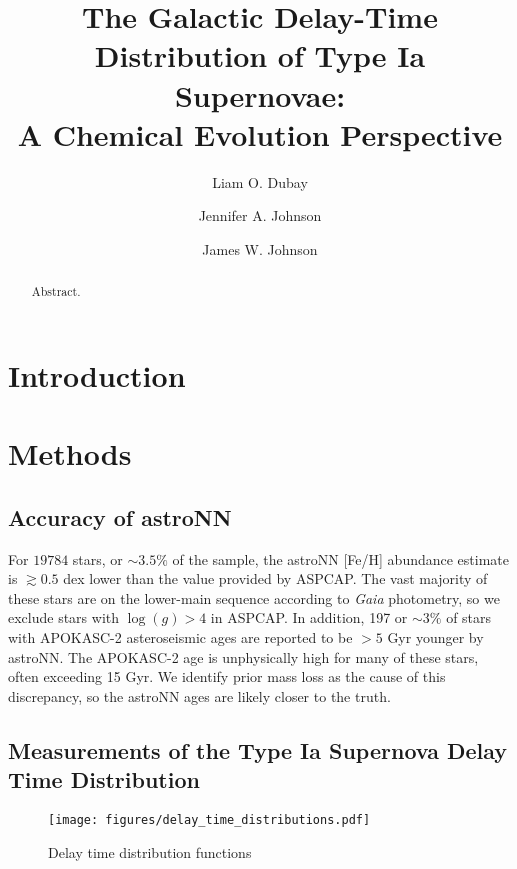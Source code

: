 \documentclass[twocolumn]{aastex631}
\begin{document}
\title{The Galactic Delay-Time Distribution of Type Ia Supernovae:\\
    A Chemical Evolution Perspective}

\author[0000-0003-3781-0747]{Liam O. Dubay}
\author[0000-0001-7258-1834]{Jennifer A. Johnson}
\author[0000-0002-6534-8783]{James W. Johnson}

\begin{abstract}
    Abstract.
\end{abstract}

\section{Introduction}

\section{Methods}
\label{sec:methods}

\subsection{Accuracy of astroNN}
\label{sec:astronn-quality}

For $19784$ stars, or $\sim3.5\%$ of the sample, the astroNN [Fe/H] abundance estimate is $\gtrsim0.5$ dex lower than the value provided by ASPCAP. The vast majority of these stars are on the lower-main sequence according to \textit{Gaia} photometry, so we exclude stars with $\log(g) > 4$ in ASPCAP. In addition, 197 or $\sim3\%$ of stars with APOKASC-2 asteroseismic ages are reported to be $>5$ Gyr younger by astroNN. The APOKASC-2 age is unphysically high for many of these stars, often exceeding 15 Gyr. We identify prior mass loss as the cause of this discrepancy, so the astroNN ages are likely closer to the truth.

\subsection{Measurements of the Type Ia Supernova Delay Time Distribution}
\label{sec:dtd-measurements}

\begin{figure}
    \centering
    \texttt{[image: figures/delay\_time\_distributions.pdf]}
    \caption{Delay time distribution functions}
    \label{fig:dtds}
\end{figure}
\end{document}
